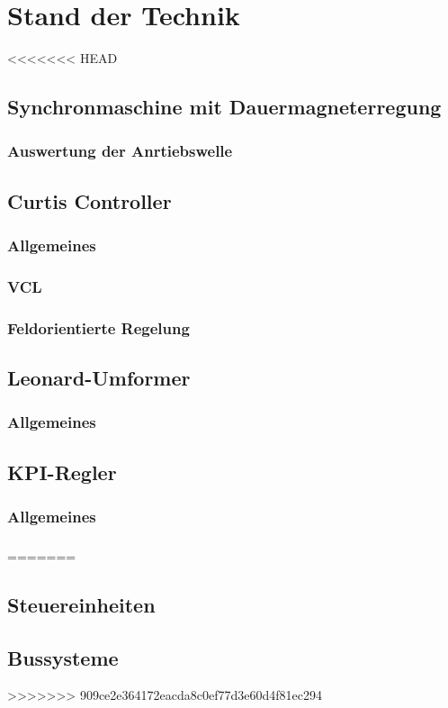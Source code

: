 \chapter{Stand der Technik}
<<<<<<< HEAD


\section{Synchronmaschine mit Dauermagneterregung}
\subsection{Auswertung der Anrtiebswelle}

\section{Curtis Controller}
\subsection{Allgemeines}
\subsection{VCL}
\subsection{Feldorientierte Regelung}

\section{Leonard-Umformer}
\subsection{Allgemeines}
\subsection{ }

\section{KPI-Regler}
\subsection{Allgemeines}
\subsection{ }
=======
\section{Steuereinheiten}
\section{Bussysteme}
>>>>>>> 909ce2e364172eacda8c0ef77d3e60d4f81ec294
